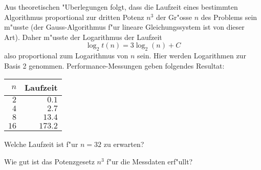 Aus theoretischen "Uberlegungen folgt, dass die Laufzeit eines bestimmten
Algorithmus proportional zur dritten Potenz $n^3$ der
Gr"osse $n$ des Problems sein m"usste (der Gauss-Algorithmus
f"ur lineare Gleichungssystem ist von dieser Art). Daher m"usste
der Logarithmus der Laufzeit 
\[
\log_2 t(n)=3\log_2(n) +C
\]
also proportional zum Logarithmus von $n$ sein.
Hier werden Logarithmen zur Basis 2 genommen.
Performance-Messungen geben folgendes Resultat:
\begin{center}
\begin{tabular}{|r|r|}
\hline
$n$&Laufzeit\\
\hline
$ 2$&$  0.1$\\
$ 4$&$  2.7$\\
$ 8$&$ 13.4$\\
$16$&$173.2$\\
\hline
\end{tabular}
\end{center}
\begin{teilaufgaben}
\item Welche Laufzeit ist f"ur $n=32$ zu erwarten?
\item Wie gut ist das Potenzgesetz $n^3$ f"ur die Messdaten erf"ullt?
\end{teilaufgaben}

